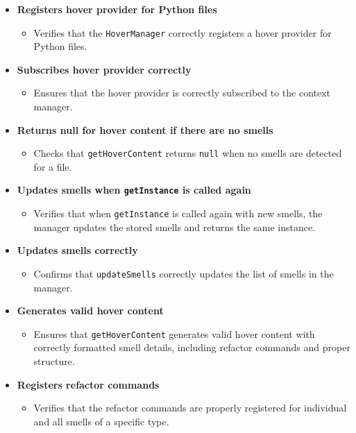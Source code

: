 \documentclass[12pt, titlepage]{article}
\begin{document}
  \begin{itemize}
    \item \textbf{Registers hover provider for Python files}
      \begin{itemize}
        \item Verifies that the \texttt{HoverManager} correctly
          registers a hover provider for Python files.
      \end{itemize}

    \item \textbf{Subscribes hover provider correctly}
      \begin{itemize}
        \item Ensures that the hover provider is correctly subscribed
          to the context manager.
      \end{itemize}

    \item \textbf{Returns null for hover content if there are no smells}
      \begin{itemize}
        \item Checks that \texttt{getHoverContent} returns
          \texttt{null} when no smells are detected for a file.
      \end{itemize}

    \item \textbf{Updates smells when \texttt{getInstance} is called again}
      \begin{itemize}
        \item Verifies that when \texttt{getInstance} is called again
          with new smells, the manager updates the stored smells and
          returns the same instance.
      \end{itemize}

    \item \textbf{Updates smells correctly}
      \begin{itemize}
        \item Confirms that \texttt{updateSmells} correctly updates
          the list of smells in the manager.
      \end{itemize}

    \item \textbf{Generates valid hover content}
      \begin{itemize}
        \item Ensures that \texttt{getHoverContent} generates valid
          hover content with correctly formatted smell details,
          including refactor commands and proper structure.
      \end{itemize}

    \item \textbf{Registers refactor commands}
      \begin{itemize}
        \item Verifies that the refactor commands are properly
          registered for individual and all smells of a specific type.
      \end{itemize}
  \end{itemize}
\end{document}
